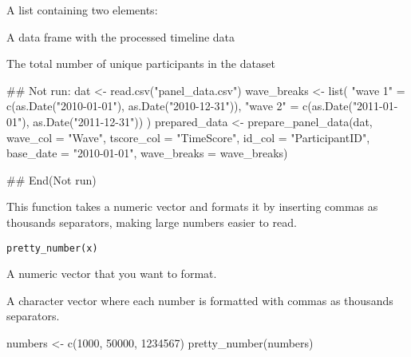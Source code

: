 \documentclass[a4paper]{book}
\begin{document}
%
\begin{Value}
A list containing two elements:
\begin{ldescription}
\item[\code{df\_timeline}] A data frame with the processed timeline data
\item[\code{n\_total\_participants}] The total number of unique participants in the dataset
\end{ldescription}
\end{Value}
%
\begin{Examples}
\begin{ExampleCode}
## Not run: 
dat <- read.csv("panel_data.csv")
wave_breaks <- list(
  "wave 1" = c(as.Date("2010-01-01"), as.Date("2010-12-31")),
  "wave 2" = c(as.Date("2011-01-01"), as.Date("2011-12-31"))
)
prepared_data <- prepare_panel_data(dat, wave_col = "Wave", tscore_col = "TimeScore",
                                    id_col = "ParticipantID", base_date = "2010-01-01",
                                    wave_breaks = wave_breaks)

## End(Not run)

\end{ExampleCode}
\end{Examples}
%
\begin{Description}
This function takes a numeric vector and formats it by inserting commas as
thousands separators, making large numbers easier to read.
\end{Description}
%
\begin{Usage}
\begin{verbatim}
pretty_number(x)
\end{verbatim}
\end{Usage}
%
\begin{Arguments}
\begin{ldescription}
\item[\code{x}] A numeric vector that you want to format.
\end{ldescription}
\end{Arguments}
%
\begin{Value}
A character vector where each number is formatted with commas
as thousands separators.
\end{Value}
%
\begin{Examples}
\begin{ExampleCode}
numbers <- c(1000, 50000, 1234567)
pretty_number(numbers)

\end{ExampleCode}
\end{Examples}
\end{document}
